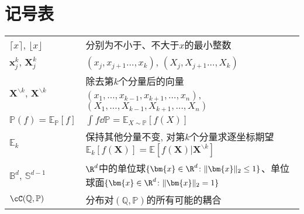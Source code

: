 \section*{记号表}

\noindent
\begin{tabular}{p{} p{}}
\hline
	$\lceil x \rceil$, $\lfloor x \rfloor$ & 分别为不小于、不大于$x$的最小整数 \\
	$\bm{x}_j^k$, $\bm{X}_j^k$ & $(x_j, x_{j+1} \dots, x_k)$, $(X_j, X_{j+1} \dots, X_k)$ \\
	$\bm{X}^{\backslash k}$, $\bm{X}^{\backslash k}$ & 除去第$k$个分量后的向量$(x_1, \dots, x_{k-1}, x_{k+1}, \dots, x_n)$, $(X_1, \dots, X_{k-1}, X_{k+1}, \dots, X_n)$ \\
	$\mathbb{P}(f) = \mathbb{E}_{\mathbb{P}}[f]$ & $\int f \dd \mathbb{P} = \mathbb{E}_{X \sim \mathbb{P}} [f(X)]$ \\
	$\mathbb{E}_k$ & 保持其他分量不变, 对第$k$个分量求逐坐标期望$\mathbb{E}_k[f(\bm{X})] = \mathbb{E}[f(\bm{X}) | \bm{X}^{\backslash k}]$ \\
	$\mathbb{B}^d$, $\mathbb{S}^{d-1}$ & $\R^d$中的单位球$\{\bm{x} \in \R^d \colon \|\bm{x}\|_2 \leq 1 \}$、单位球面$\{\bm{x} \in \R^d \colon \|\bm{x}\|_2 = 1 \}$ \\
	$\cC(\mathbb{Q}, \mathbb{P})$ & 分布对$(\mathbb{Q}, \mathbb{P})$的所有可能的耦合 \\
\hline
\end{tabular}
